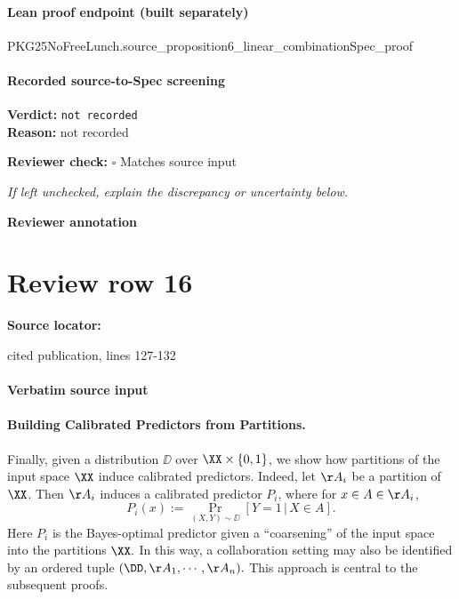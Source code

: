 \documentclass[10pt]{article}
\newcommand{\reviewerbox}{%
  \par\noindent\fbox{\parbox{0.96\linewidth}{\rule{0pt}{0.38in}}}\par
}
\newcommand{\reviewmatch}[1]{%
  \par\noindent\textbf{Reviewer check:} $\square$\; #1\par
  \noindent\emph{If left unchecked, explain the discrepancy or uncertainty below.}\par
}
\begin{document}
\paragraph{Lean proof endpoint (built separately)}\begin{ReviewVerbatim}
PKG25NoFreeLunch.source_proposition6_linear_combinationSpec_proof
\end{ReviewVerbatim}

\paragraph{Recorded source-to-Spec screening}
\textbf{Verdict:} \texttt{not recorded}
\\
\textbf{Reason:} not recorded
\reviewmatch{Matches source input}
\noindent\textbf{Reviewer annotation}\par
\reviewerbox
\clearpage
\hypertarget{source-claim-ca52c024caeea892}{}
\section*{Review row 16}
\textbf{Source locator:} {\footnotesize\raggedright cited publication, lines 127-\allowbreak{}132\par}
\paragraph{Verbatim source input}
\begin{ReviewVerbatim}
\paragraph{Building Calibrated Predictors from Partitions.}
Finally, given a distribution $\DD$ over $\XX\times \{0,1\}$, we show how partitions of the input space $\XX$ induce calibrated predictors. Indeed, let $\AA_i$ be a partition of $\XX$. Then $\AA_i$ induces a calibrated predictor $P_i$, where for $x\in A \in \AA_i$,
\begin{equation}
    P_i(x) := \Pr_{(X,Y)\sim \DD}[Y=1\,|\,X\in A].
\end{equation}
Here $P_i$ is the Bayes-optimal predictor given a ``coarsening'' of the input space into the partitions $\XX.$ In this way, a collaboration setting may also be identified by an ordered tuple $(\DD, \AA_1, \cdots, \AA_n).$ This approach is central to the subsequent proofs.
\end{ReviewVerbatim}
\end{document}
